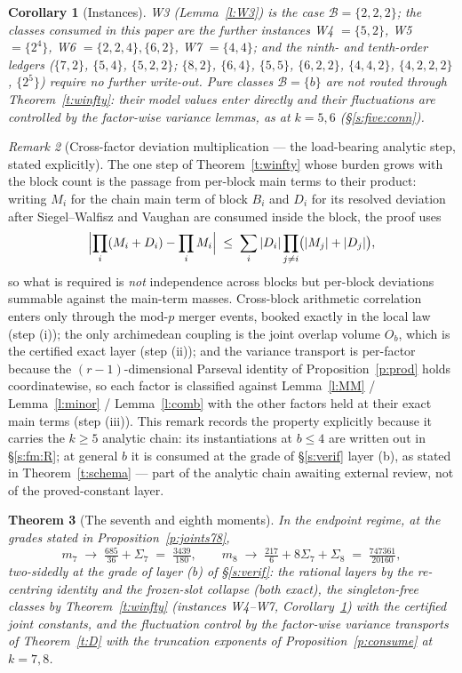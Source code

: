 \documentclass[11pt]{article}
\numberwithin{equation}{section}
\newtheorem{theorem}{Theorem}[section]
\newtheorem{corollary}[theorem]{Corollary}
\theoremstyle{definition}
\theoremstyle{remark}
\newtheorem{remark}[theorem]{Remark}
\begin{document}
\begin{corollary}[Instances]\label{c:winst}
W3 (Lemma~\ref{l:W3}) is the case $\mathcal B=\{2,2,2\}$; the
classes consumed in this paper are the further instances
\emph{W4} $=\{5,2\}$, \emph{W5} $=\{2^4\}$, \emph{W6}
$=\{2,2,4\},\{6,2\}$, \emph{W7} $=\{4,4\}$; and the ninth- and
tenth-order ledgers ($\{7,2\}$, $\{5,4\}$, $\{5,2,2\}$;
$\{8,2\}$, $\{6,4\}$, $\{5,5\}$, $\{6,2,2\}$, $\{4,4,2\}$,
$\{4,2,2,2\}$, $\{2^5\}$) require no further write-out.
Pure classes $\mathcal B=\{b\}$ are not routed through
Theorem~\ref{t:winfty}: their model values enter directly and
their fluctuations are controlled by the factor-wise variance
lemmas, as at $k=5,6$ (\S\ref{s:five:conn}).
\end{corollary}

\begin{remark}[Cross-factor deviation multiplication ---
the load-bearing analytic step, stated explicitly]
\label{r:transport}
The one step of Theorem~\ref{t:winfty} whose burden grows with
the block count is the passage from per-block main terms to
their product: writing $M_i$ for the chain main term of block
$B_i$ and $D_i$ for its resolved deviation after
Siegel--Walfisz and Vaughan are consumed inside the block, the
proof uses
\[
\Bigl|\prod_i(M_i+D_i)-\prod_iM_i\Bigr|
\;\le\;\sum_i|D_i|\prod_{j\ne i}\bigl(|M_j|+|D_j|\bigr),
\]
so what is required is \emph{not} independence across blocks
but per-block deviations summable against the main-term
masses. Cross-block arithmetic correlation enters only through
the mod-$p$ merger events, booked exactly in the local law
(step (i)); the only archimedean coupling is the joint overlap
volume $O_b$, which is the certified exact layer (step (ii));
and the variance transport is per-factor because the
$(r{-}1)$-dimensional Parseval identity of
Proposition~\ref{p:prod} holds coordinatewise, so each factor
is classified against Lemma~\ref{l:MM} /
Lemma~\ref{l:minor} / Lemma~\ref{l:comb} with the other
factors held at their exact main terms (step (iii)). This
remark records the property explicitly because it carries the
$k\ge5$ analytic chain: its instantiations at $b\le4$ are
written out in \S\ref{s:fm:R}; at general $b$ it is consumed
at the grade of \S\ref{s:verif} layer (b), as stated in
Theorem~\ref{t:schema} --- part of the analytic chain awaiting
external review, not of the proved-constant layer.
\end{remark}

\begin{theorem}[The seventh and eighth moments]\label{t:m78}
In the endpoint regime, at the grades stated in
Proposition~\ref{p:joints78},
\[
m_7\;\to\;\tfrac{685}{36}+\Sigma_7\;=\;\tfrac{3439}{180},
\qquad
m_8\;\to\;\tfrac{217}6+8\Sigma_7+\Sigma_8\;=\;\tfrac{747361}{20160},
\]
two-sidedly at the grade of layer (b) of \S\ref{s:verif}: the
rational layers by the re-centring identity and the frozen-slot
collapse (both exact), the singleton-free classes by
Theorem~\ref{t:winfty} (instances W4--W7,
Corollary~\ref{c:winst}) with the certified joint
constants, and the fluctuation control by the factor-wise
variance transports of Theorem~\ref{t:D} with the truncation
exponents of Proposition~\ref{p:consume} at $k=7,8$.
\end{theorem}
\end{document}
